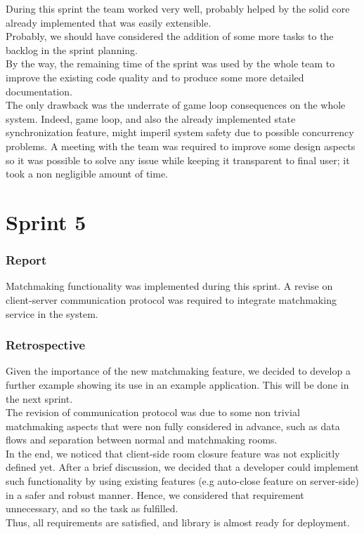 During this sprint the team worked very well, probably helped by the solid core already implemented that was easily extensible.
\\
Probably, we should have considered the addition of some more tasks to the backlog in the sprint planning.
\\
By the way, the remaining time of the sprint was used by the whole team to improve the existing code quality and to produce some more detailed documentation.
\\
The only drawback was the underrate of game loop consequences on the whole system. Indeed, game loop, and also the already implemented state synchronization feature, might imperil system safety due to possible concurrency problems. A meeting with the team was required to improve some design aspects so it was possible to solve any issue while keeping it transparent to final user; it took a non negligible amount of time.

\section{Sprint 5}

\subsubsection{Report}
Matchmaking functionality was implemented during this sprint.
A revise on client-server communication protocol was required to integrate matchmaking service in the system.

\subsubsection{Retrospective}

Given the importance of the new matchmaking feature, we decided to develop a further example showing its use in an example application. This will be done in the next sprint.
\\
The revision of communication protocol was due to some non trivial matchmaking aspects that were non fully considered in advance, such as data flows and separation between normal and matchmaking rooms. 
\\
In the end, we noticed that client-side room closure feature was not explicitly defined yet. 
After a brief discussion, we decided that a developer could implement such functionality by using existing features (e.g auto-close feature on server-side) in a safer and robust manner. Hence, we considered that requirement unnecessary, and so the task as fulfilled.
\\
Thus, all requirements are satisfied, and library is almost ready for deployment.


